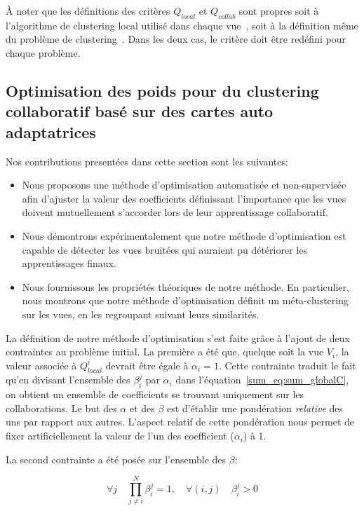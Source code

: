 À noter que les définitions des critères $Q_{local}$ et $Q_{collab}$ sont propres soit à l'algorithme de clustering local utilisé dans chaque vue~\cite{ghassany2012collaborative}, soit à la définition même du problème de clustering~\cite{sublime2018information}. Dans les deux cas, le critère doit être redéfini pour chaque problème.

\subsection{Optimisation des poids pour du clustering collaboratif basé sur des cartes auto adaptatrices}

Nos contributions presentées dans cette section sont les suivantes:
\begin{itemize}
    \item Nous proposons une méthode d'optimisation automatisée et non-supervisée afin d'ajuster la valeur des coefficients définissant l'importance que les vues doivent mutuellement s'accorder lors de leur apprentissage collaboratif.
    \item Nous démontrons expérimentalement que notre méthode d'optimisation est capable de détecter les vues bruitées qui auraient pu détériorer les apprentissages finaux.
    \item Nous fournissons les propriétés théoriques de notre méthode. En particulier, nous montrons que notre méthode d'optimisation définit un méta-clustering sur les vues, en les regroupant suivant leurs similarités.
\end{itemize}

La définition de notre méthode d'optimisation s'est faite grâce à l'ajout de deux contraintes au problème initial. La première a été que, quelque soit la vue $V_i$, la valeur associée à $Q^i_{local}$ devrait être égale à $\alpha_i=1$. Cette contrainte traduit le fait qu'en divisant l'ensemble des $\beta^j_i$ par $\alpha_i$ dans l'équation~\ref{sum_eq:sum_globalC}, on obtient un ensemble de coefficients se trouvant uniquement sur les collaborations. Le but des $\alpha$ et des $\beta$ est d'établir une pondération \textit{relative} des uns par rapport aux autres. L'aspect relatif de cette pondération nous permet de fixer artificiellement la valeur de l'un des coefficient ($\alpha_i$) à 1.

La second contrainte a été posée sur l'ensemble des $\beta$:

\begin{equation}
    \forall j \quad \prod_{j \neq i}^N \beta^j_i = 1, \quad
    \forall (i,j) \quad \beta^j_i >0 
\end{equation}

